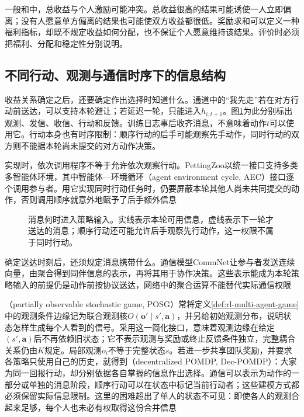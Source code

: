 一般和中，总收益与个人激励可能冲突。总收益很高的结果可能诱使一人立即偏离；没有人愿意单方偏离的结果也可能使双方收益都很低。奖励求和可以定义一种福利指标，却既不规定收益如何分配，也不保证个人愿意维持该结果。评价时必须把福利、分配和稳定性分别说明。

\subsection{不同行动、观测与通信时序下的信息结构}
\label{sec:rl-multi-agent-information}

收益关系确定之后，还要确定作出选择时知道什么。通道中的“我先走”若在对方行动前送达，可以支持本轮避让；若延迟一轮，只能进入$h_{i,t+1}$。图\ref{fig:rl-multi-agent-timing}为此分别标出观测、发信、收信、行动和反馈。训练日志事后收齐消息，不意味着动作$t$可以使用它。行动本身也有时序限制：顺序行动的后手可能观察先手动作，同时行动的双方则不能据本轮尚未提交的对方动作决策。

实现时，依次调用程序不等于允许依次观察行动。PettingZoo以统一接口支持多类多智能体环境，其中智能体—环境循环（agent environment cycle, AEC）接口逐个调用参与者。用它实现同时行动任务时，仍要屏蔽本轮其他人尚未共同提交的动作，否则调用顺序就意外地赋予了后手额外信息

\begin{figure}[htbp]
 \centering
 
 \caption{消息何时进入策略输入。实线表示本轮可用信息，虚线表示下一轮才送达的消息；顺序行动还可能允许后手观察先行动作，这一权限不属于同时行动。}
 \label{fig:rl-multi-agent-timing}
\end{figure}

确定送达时刻后，还须规定消息携带什么。通信模型CommNet让参与者发送连续向量，由聚合得到同伴信息的表示，再将其用于协作决策。这些表示能成为本轮策略输入的前提仍是动作前按协议送达，网络中的聚合运算不能替代实际通信权限

（partially observable stochastic game, POSG）常将定义\ref{def:rl-multi-agent-game}中的观测条件边缘记为联合观测核$O(\bm o'\mid s',\bm a)$，并另给初始观测分布，说明状态怎样生成每个人看到的信号。采用这一简化接口，意味着观测边缘在给定$(s',\bm a)$后不再依赖旧状态；它不表示观测与奖励或终止反馈条件独立，完整耦合关系仍由$K$规定。局部观测$o_i$不等于完整状态$s$。若进一步共享团队奖励，并要求各策略只使用自己的历史，就得到（decentralized POMDP, Dec-POMDP）：大家为同一回报行动，却分别依据各自掌握的信息作出选择。通信可以表示为动作的一部分或单独的消息阶段，顺序行动可以在状态中标记当前行动者；这些建模方式都必须保留实际信息限制。这里的困难超出了单人的状态不可见：即使各人的观测合起来足够，每个人也未必有权取得这份合并信息

